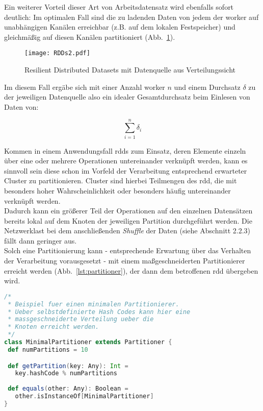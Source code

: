 Ein weiterer Vorteil dieser Art von Arbeitsdatensatz wird ebenfalls sofort deutlich: Im optimalen Fall sind die zu ladenden Daten von jedem der \gls{worker} auf unabhängigen Kanälen erreichbar (z.B. auf dem lokalen Festspeicher) und gleichmäßig auf diesen Kanälen partitioniert (Abb.~\ref{fig:rdds2}).\\

\begin{figure}[h!]
	\centering
  \texttt{[image: RDDs2.pdf]}
	\caption{Resilient Distributed Datasets mit Datenquelle aus Verteilungssicht}
	\label{fig:rdds2}
\end{figure}

Im diesem Fall ergäbe sich mit einer Anzahl \gls{worker} $n$ und einem Durchsatz $\delta$ zu der jeweiligen Datenquelle also ein idealer Gesamtdurchsatz beim Einlesen von Daten von:

\begin{equation}
	\sum_{i=1}^{n} \delta_i
\end{equation}

Kommen in einem Anwendungsfall \gls{rdd}s zum Einsatz, deren Elemente einzeln über eine oder mehrere Operationen untereinander verknüpft werden, kann es sinnvoll sein diese schon im Vorfeld der Verarbeitung entsprechend erwarteter Cluster zu partitionieren. Cluster sind hierbei Teilmengen des \gls{rdd}, die mit besonders hoher Wahrscheinlichkeit oder besonders häufig untereinander verknüpft werden.\\

Dadurch kann ein größerer Teil der Operationen auf den einzelnen Datensätzen bereits lokal auf dem Knoten der jeweiligen Partition durchgeführt werden. Die Netzwerklast bei dem anschließenden \textit{Shuffle} der Daten (siehe Abschnitt 2.2.3) fällt dann geringer aus.\\

Solch eine Partitionierung kann - entsprechende Erwartung über das Verhalten der Verarbeitung vorausgesetzt - mit einem maßgeschneiderten Partitionierer erreicht werden (Abb.~\ref{lst:partitioner}), der dann dem betroffenen \gls{rdd} übergeben wird.\\

\begin{lstlisting}[language=Scala,caption={Beispiel: Minimaler Partitionierer},label={lst:partitioner}]
/*
 * Beispiel fuer einen minimalen Partitionierer. 
 * Ueber selbstdefinierte Hash Codes kann hier eine 
 * massgeschneiderte Verteilung ueber die 
 * Knoten erreicht werden.
 */
class MinimalPartitioner extends Partitioner {
 def numPartitions = 10

 def getPartition(key: Any): Int =
   key.hashCode % numPartitions
	
 def equals(other: Any): Boolean =
   other.isInstanceOf[MinimalPartitioner]
}
\end{lstlisting}

